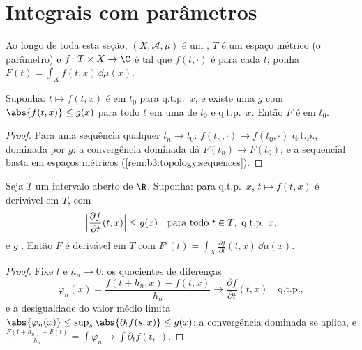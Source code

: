 \section{Integrais com parâmetros}

Ao longo de toda esta seção, $(X, \mathcal A, \mu)$ é um , $T$ é um
espaço métrico (o parâmetro) e $f \colon T \times X \to \C$ é tal que $f(t, \cdot)$ é  para
cada $t$; ponha $F(t) = \int_X
f(t, x)\,\dd\mu(x)$.

\begin{theorem}[Continuidade]\label{thm:b3:lebesgue:paramcont}
Suponha: $t \mapsto f(t,x)$ é  em $t_0$ para q.t.p.\ $x$, e existe
uma  $g$ com $\abs{f(t,x)} \leq
g(x)$ para todo $t$ em uma
 de $t_0$ e q.t.p.\ $x$. Então $F$ é  em
$t_0$.
\end{theorem}

\begin{proof}
Para uma sequência qualquer $t_n \to t_0$: $f(t_n, \cdot) \to f(t_0,
\cdot)$ q.t.p., dominada por $g$:
a convergência dominada dá $F(t_n) \to F(t_0)$; e a  sequencial basta em
espaços métricos (\cref{rem:b3:topology:sequences}).
\end{proof}

\begin{theorem}
\label{thm:b3:lebesgue:paramdiff}
Seja $T$ um intervalo aberto de $\R$. Suponha: para q.t.p.\
$x$, $t \mapsto f(t,x)$ é derivável em $T$, com
\[
\Bigl|\frac{\partial f}{\partial t}(t, x)\Bigr| \leq g(x)
\quad \text{para todo } t \in T,\ \text{q.t.p. } x,
\]
e $g$ . Então $F$ é derivável em $T$ com $F'(t)
= \int_X \frac{\partial f}{\partial t}(t, x)\,\dd\mu(x)$.
\end{theorem}

\begin{proof}
Fixe $t$ e $h_n \to 0$: os quocientes de diferenças
\[
\varphi_n(x) = \frac{f(t + h_n, x) - f(t, x)}{h_n}
\longrightarrow \frac{\partial f}{\partial t}(t,x)
\quad\text{q.t.p.},
\]
e a desigualdade do valor médio limita $\abs{\varphi_n(x)} \leq
\sup_{s}\abs{\partial_tf(s,x)} \leq g(x)$: a convergência dominada
se aplica, e $\frac{F(t + h_n) - F(t)}{h_n} = \int\varphi_n \to
\int\partial_t f(t, \cdot)$.
\end{proof}


